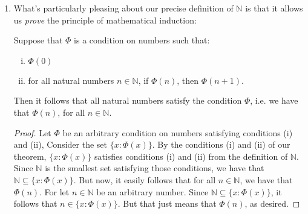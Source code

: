 \begin{enumerate}[{\thesection}.1]
\begin{proof}
\begin{enumerate}[(i)]
	\end{enumerate}
		
		So, if $X$ satisfies conditions (i) and (ii) and $\frac{1}{2}\in X$, then there is a smaller set, viz. $X\setminus  \{\frac{k}{2}: k\in \mathbb{Z}\text{ and }k\text{ is odd}\}$, which satisfies conditions (i) and (ii), too. But then $X$ cannot be the smallest set satisfying conditions (i) and (ii), i.e. $X$ cannot be $\mathbb{N}$. Now suppose, for a final proof by contradiction, that $\frac{1}{2}\in\mathbb{N}$. Since $\mathbb{N}$ satisfies conditions (i) and (ii) from its definition,  we've just seen that this would entail that $\mathbb{N}\neq \mathbb{N}$, which is impossible. Hence, by indirect proof, $\frac{1}{2}\notin\mathbb{N}$, as desired.

		\end{proof}

It's not terribly important that you get all the details of this argument, but I want you to see the general form of how you might go about proving that something's not a member of an inductively defined set (and that that's surprisingly difficult). If you really want to understand the proof (and, again, you don't have to), try to prove the same result using mathematical induction.

\item What's particularly pleasing about our precise definition of $\mathbb{N}$ is that it allows us \emph{prove} the principle of mathematical induction:
	
	\begin{theorem}
	Suppose that $\Phi$ is a condition on numbers such that:
		\begin{enumerate}[(i)]
		
			\item $\Phi(0)$
			
			\item for all natural numbers $n\in\mathbb{N}$, if $\Phi(n)$, then $\Phi(n+1)$.
		
		\end{enumerate}	
		Then it follows that all natural numbers satisfy the condition $\Phi$, i.e. we have that $\Phi(n)$, for all $n\in \mathbb{N}$.
	\end{theorem}
	\begin{proof}
	Let $\Phi$ be an arbitrary condition on numbers satisfying conditions (i) and (ii), Consider the set $\{x:\Phi(x)\}$. By the conditions (i) and (ii) of our theorem, $\{x:\Phi(x)\}$ satisfies conditions (i) and (ii) from the definition of $\mathbb{N}$. Since $\mathbb{N}$ is the smallest set satisfying those conditions, we have that $\mathbb{N}\subseteq\{x:\Phi(x)\}$. But now, it easily follows that for all $n\in\mathbb{N}$, we have that $\Phi(n)$. For let $n\in\mathbb{N}$ be an arbitrary number. Since $\mathbb{N}\subseteq\{x:\Phi(x)\}$, it follows that $n\in\{x:\Phi(x)\}$. But that just means that $\Phi(n)$, as desired.
	\end{proof}


\end{enumerate}
